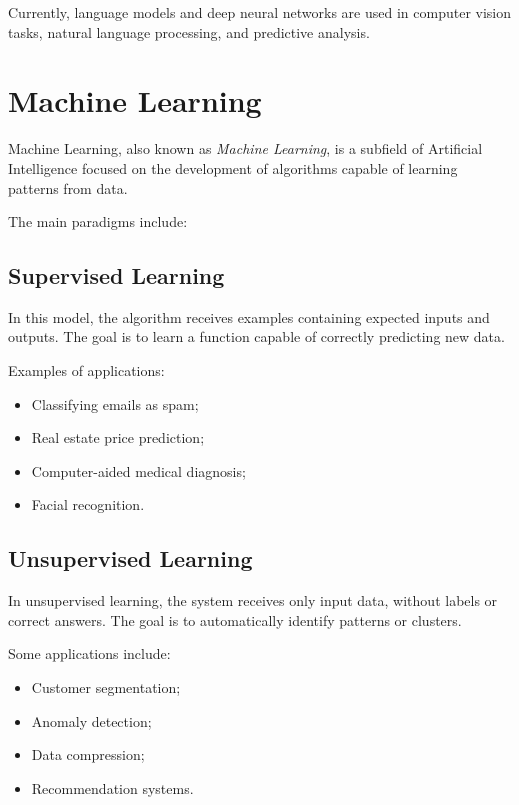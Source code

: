 \documentclass[11pt]{article}
\begin{document}
Currently, language models and deep neural networks are used in computer vision tasks,
natural language processing, and predictive analysis.
 

\section{Machine Learning}

Machine Learning, also known as \textit{Machine Learning}, is a subfield of
Artificial Intelligence focused on the development of algorithms capable of learning patterns from
data.

The main paradigms include: 

\subsection{Supervised Learning}

In this model, the algorithm receives examples containing expected inputs and outputs. The goal is
to learn a function capable of correctly predicting new data.

Examples of applications:

\begin{itemize}
    \item Classifying emails as spam;
    \item Real estate price prediction;
    \item Computer-aided medical diagnosis;
    \item Facial recognition.
\end{itemize}
 

\subsection{Unsupervised Learning}

In unsupervised learning, the system receives only input data, without labels
or correct answers. The goal is to automatically identify patterns or clusters.

Some applications include:

\begin{itemize}
    \item Customer segmentation;
    \item Anomaly detection;
    \item Data compression;
    \item Recommendation systems.
\end{itemize} 
\end{document}
